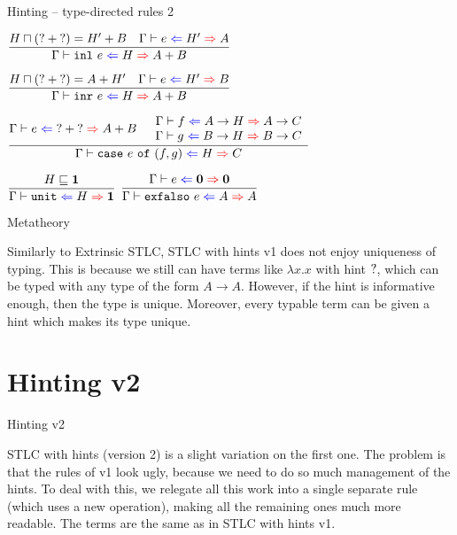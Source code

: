 \documentclass{beamer}
\newcommand{\Fun}[2]{#1 \to #2}
\newcommand{\Sum}[2]{#1 + #2}
\newcommand{\Unit}{\textbf{1}}
\newcommand{\Empty}{\textbf{0}}
\newcommand{\fun}[2]{\lambda #1. #2}
\newcommand{\inl}[1][]{\texttt{inl}\ #1}
\newcommand{\inr}[1][]{\texttt{inr}\ #1}
\newcommand{\case}[3]{\texttt{case}\ #1\ \texttt{of}\ (#2, #3)}
\newcommand{\unit}{\texttt{unit}}
\newcommand{\exfalso}[1][]{\texttt{exfalso}\ #1}
\newcommand{\infrule}[3][]{\displaystyle \frac{#2}{#3} \textsc{\footnotesize{#1}}}
\newcommand{\sidecond}[1]{#1}
\begin{document}
\begin{frame}{Hinting -- type-directed rules 2}

\begin{center}
  $\infrule{\sidecond{\combinehints{H}{(\Sum{\Hint}{\Hint})} = \Sum{H'}{B}} \quad \hinting{e}{H'}{A}}{\hinting{\inl[e]}{H}{\Sum{A}{B}}}$

  \vspace{2em}

  $\infrule{\sidecond{\combinehints{H}{(\Sum{\Hint}{\Hint})} = \Sum{A}{H'}} \quad \hinting{e}{H'}{B}}{\hinting{\inr[e]}{H}{\Sum{A}{B}}}$

  \vspace{2em}

  $\infrule{\hinting{e}{\Sum{\Hint}{\Hint}}{\Sum{A}{B}} \quad \begin{array}{c} \hinting{f}{\Fun{A}{H}}{\Fun{A}{C}} \\ \hinting{g}{\Fun{B}{H}}{\Fun{B}{C}} \end{array}}{\hinting{\case{e}{f}{g}}{H}{C}}$

  \vspace{2em}

  $\infrule{\sidecond{\hintorder{H}{\Unit}}}{\hinting{\unit}{H}{\Unit}}$ \quad
  $\infrule{\hinting{e}{\Empty}{\Empty}}{\hinting{\exfalso[e]}{A}{A}}$
\end{center}

\end{frame}

\begin{frame}{Metatheory}

Similarly to Extrinsic STLC, STLC with hints v1 does not enjoy uniqueness of typing. This is because we still can have terms like $\fun{x}{x}$ with hint $\mathbf{?}$, which can be typed with any type of the form $\Fun{A}{A}$. However, if the hint is informative enough, then the type is unique. Moreover, every typable term can be given a hint which makes its type unique.

\end{frame}

\section{Hinting v2}

\newcommand{\hintfor}[2]{#1\ \triangle\ #2}

\begin{frame}{Hinting v2}

STLC with hints (version 2) is a slight variation on the first one. The problem is that the rules of v1 look ugly, because we need to do so much management of the hints. To deal with this, we relegate all this work into a single separate rule (which uses a new operation), making all the remaining ones much more readable. The terms are the same as in STLC with hints v1.

\end{frame}
\end{document}
